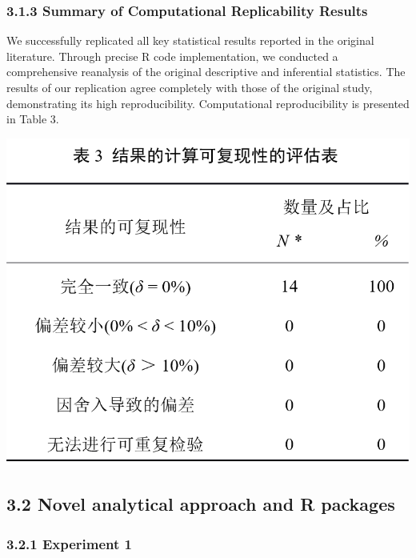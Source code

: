 \documentclass[
  man]{apa6}
\begin{document}
\subsubsection{3.1.3 Summary of Computational Replicability Results}\label{summary-of-computational-replicability-results}

We successfully replicated all key statistical results reported in the original literature. Through precise R code implementation, we conducted a comprehensive reanalysis of the original descriptive and inferential statistics. The results of our replication agree completely with those of the original study, demonstrating its high reproducibility. Computational reproducibility is presented in Table 3.

\includegraphics{pic/table_3.png}

\subsection{3.2 Novel analytical approach and R packages}\label{novel-analytical-approach-and-r-packages-1}

\subsubsection{3.2.1 Experiment 1}\label{experiment-1-1}
\end{document}
